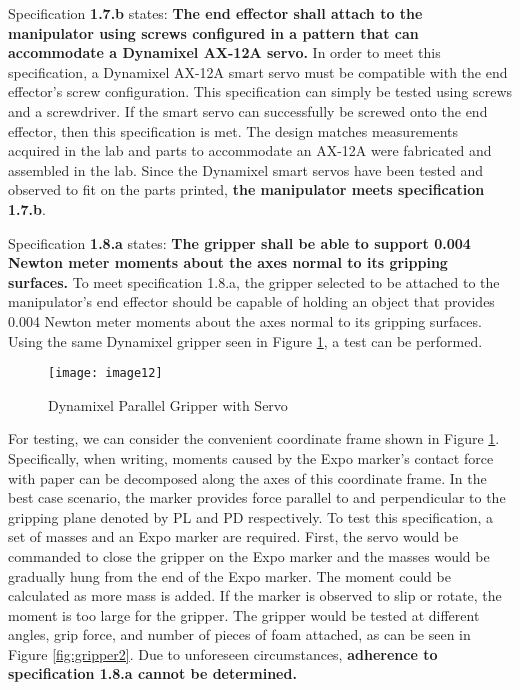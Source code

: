 Specification \textbf{1.7.b} states: \textbf{The end effector shall attach to the manipulator using screws configured in a pattern that can accommodate a Dynamixel AX-12A servo.} In order to meet this specification, a Dynamixel AX-12A smart servo must be compatible with the end effector’s screw configuration. This specification can simply be tested using screws and a screwdriver. If the smart servo can successfully be screwed onto the end effector, then this specification is met. The design matches measurements acquired in the lab and parts to accommodate an AX-12A were fabricated and assembled in the lab. Since the Dynamixel smart servos have been tested and observed to fit on the parts printed, \textbf{the manipulator meets specification 1.7.b}.


Specification \textbf{1.8.a} states: \textbf{The gripper shall be able to support 0.004 Newton meter moments about the axes normal to its gripping surfaces.} To meet specification 1.8.a, the gripper selected to be attached to the manipulator’s end effector should be capable of holding an object that provides 0.004 Newton meter moments about the axes normal to its gripping surfaces. Using the same Dynamixel gripper seen in Figure \ref{fig:gripper4}, a test can be performed.

\begin{figure}[htp]
  \centering
  \texttt{[image: image12]}
  \caption{Dynamixel Parallel Gripper with Servo}
  \label{fig:gripper4}
\end{figure}

For testing, we can consider the convenient coordinate frame shown in Figure \ref{fig:gripper4}. Specifically, when writing, moments caused by the Expo marker’s contact force with paper can be decomposed along the axes of this coordinate frame. In the best case scenario, the marker provides force parallel to and perpendicular to the gripping plane denoted by PL and PD respectively.
To test this specification, a set of masses and an Expo marker  are required. First, the servo would be commanded to close the gripper on the Expo marker and the masses would be gradually hung from the end of the Expo marker. The moment could be calculated as more mass is added. If the marker is observed to slip or rotate, the moment is too large for the gripper. The gripper would be tested at different angles, grip force, and number of pieces of foam attached, as can be seen in Figure \ref{fig:gripper2}. Due to unforeseen circumstances, \textbf{adherence to specification 1.8.a cannot be determined.}


